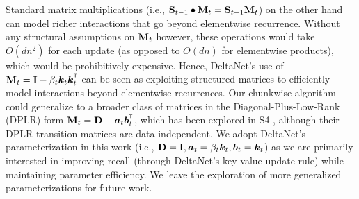 Standard matrix multiplications (i.e., ${\mathbf{S}}_{t-1}\bullet {\mathbf{M}}_t = {\mathbf{S}}_{t-1}{\mathbf{M}}_t$) on the other hand can model richer  interactions  that go beyond elementwise recurrence. Without any structural assumptions on ${\mathbf{M}}_t$ however, these operations would take $O(dn^2)$  for each update (as opposed to $O(dn)$ for elementwise products),  which would be prohibitively expensive. Hence,  DeltaNet's use of $\rmM_t = \rmI - \beta_t \vk_t\vk_t^\intercal$ can be seen as exploiting structured matrices to efficiently model interactions beyond elementwise recurrences. Our chunkwise algorithm could generalize to a broader class of matrices in the Diagonal-Plus-Low-Rank (DPLR) form $\rmM_t = \rmD - \va_t\vb_t^\intercal$, which has been explored in S4 \cite{s4}, although their DPLR transition matrices are data-independent. We adopt DeltaNet's parameterization in this work (i.e., ${\mathbf{D}}={\mathbf{I}}, {\bm{a}}_t = \beta_t {\bm{k}}_t, {\bm{b}}_t = {\bm{k}}_t$) as we are primarily interested in improving recall (through DeltaNet's key-value update rule) while maintaining parameter efficiency. We leave the exploration of more generalized parameterizations for future work.



\vspace{-4mm}
